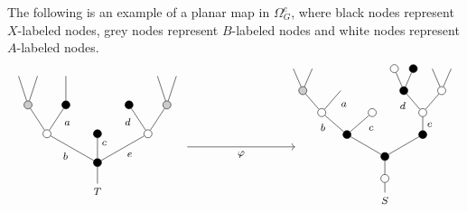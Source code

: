 \documentclass[a4paper,10pt]{article}%
\begin{document}
\begin{example}
  The following  is an example of a planar map in $\Omega_G^e$, where black nodes represent $X$-labeled nodes, grey nodes represent $B$-labeled nodes and white nodes represent $A$-labeled nodes.
  \begin{equation}\label{REGALTERNMAP EQ}
    \begin{tikzpicture}[grow=up,auto,level distance=2.3em,
      every node/.style = {font=\footnotesize},
      dummy/.style={circle,draw,inner sep=0pt,minimum size=2.25mm}]
      \tikzstyle{level 2}=[sibling distance = 4em]
      \tikzstyle{level 3}=[sibling distance = 3em]
      \tikzstyle{level 4}=[sibling distance = 1.5em]
      \node at (0,0.25) {$T$}
      child{node [dummy,fill = black] {}
        child{node [dummy,fill=white] {}
          child{node [dummy,fill = black!20] {}
            child
            child
          }
          child{node [dummy,fill = black] {}
            edge from parent node [near end] {$d$}}
          edge from parent node [swap] {$e$}}
        child{node [dummy,fill=black] {}
          edge from parent node [swap, near end] {$c$}}
        child{node [dummy,fill=white] {}
          child{node [dummy,fill = black] {}
            child
            edge from parent node [swap, near end] {$a\phantom{d}$}}
          child{node [dummy,fill = black!20] {}
            child
            child
          }
          edge from parent node {$b$}}
      };
      \begin{scope}[level distance=1.75em]
	\tikzstyle{level 3}=[sibling distance = 6em]
	\tikzstyle{level 4}=[sibling distance = 4em]
	\tikzstyle{level 5}=[sibling distance = 3em]
	\tikzstyle{level 6}=[sibling distance = 1.5em]
	\tikzstyle{level 7}=[sibling distance = 0.75em]
	\node at (8,0) {$S$}
        child{node [dummy,fill = white] {}
          child{node [dummy,fill = black] {}
            child{node [dummy,fill = black] {}
              child{node [dummy,fill=white] {}
                child{node [dummy,fill = white] {}
                  child
                  child
                }
                child{node [dummy,fill = black] {}
                  child{node [dummy,fill=black] {}
                  }
                  child{node [dummy,fill=white] {}}
                  edge from parent node [near end] {$d$}}
                edge from parent node [swap] {$e\phantom{1}$}}
            }
            child{node [dummy,fill = black] {}
              child{node [dummy,fill=white] {}
                edge from parent node [swap, near end] {$c\phantom{1}$}}
              child{node [dummy,fill=white] {}
                child{
                  edge from parent node [swap,near end] {$a\phantom{d}$}}
                child{node [dummy,fill = black!20] {}
                  child
                  child
                }
                edge from parent node [near end] {$\phantom{1}b$}}
            }
          }
        };
      \end{scope}
      \draw [->] (2.5,1.5) -- node [swap] {$\varphi$} (5.5,1.5);
    \end{tikzpicture}
  \end{equation}
\end{example}
\end{document}
